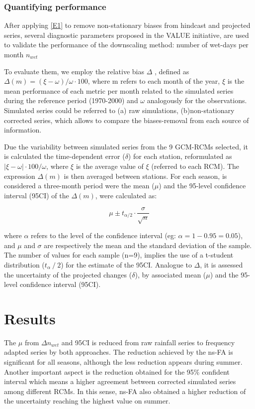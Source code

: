 \documentclass[a4paper,11pt]{article}
\begin{document}
\subsubsection{Quantifying performance} 
After applying \ref{E1} to remove non-stationary biases from hindcast and projected series, several diagnostic parameters proposed in the VALUE initiative, are used to validate the performance of the downscaling method: number of wet-days per month $n_{wet}$

To evaluate them, we employ the relative bias $\Delta$ \cite{bib9}, defined as $\Delta(m) =(\xi-\omega)/\omega \cdot 100$, where m refers to each month of the year, $\xi$ is the mean performance of each metric per month related to the simulated series during the reference period (1970-2000) and $\omega$ analogously for the observations. Simulated series could be referred to (a) raw simulations, (b)non-stationary corrected series, which allows to compare the biases-removal from each source of information. 

Due the variability between simulated series from the 9 GCM-RCMs selected, it is calculated the time-dependent error ($\delta$) for each station, reformulated as $ \lvert{\xi} - {\omega}\rvert \cdot 100/ \omega$, where ${\xi}$ is the average value of $\xi$ (referred to each RCM). The expression $\Delta(m)$ is then averaged between stations. For each season, is considered a three-month period were the mean ($\mu$) and the 95-level confidence interval (95CI) of the  $\Delta(m)$, were calculated as: 

\begin{equation}
\mu \pm t_{\alpha/2} \cdot \dfrac{\sigma}{\sqrt{n}}
\label{E2}
\end{equation}

where $\alpha$  refers to the level of the confidence interval (eg: $\alpha = 1 - 0.95 = 0.05$), and $\mu$ and $\sigma$ are respectively the mean and the standard deviation of the sample. The number of values for each sample (n=9), implies the use of a t-student distribution ($t_\alpha⁄2$) for the estimate of the 95CI. Analogue to $\Delta$, it is assessed the uncertainty of the projected changes ($\delta$), by associated mean ($\mu$) and the 95-level confidence interval (95CI). 


\section{Results}\label{sec4}

The $\mu$ from $\Delta n_{wet}$  and 95CI  is reduced from raw rainfall series to frequency adapted series by both approaches. The reduction achieved by the ns-FA is significant for all seasons, although the less reduction appears during summer. Another important aspect is the reduction obtained for the 95\% confident interval which means a higher agreement between corrected simulated series among different RCMs. In this sense, ns-FA also obtained a higher reduction of the uncertainty reaching the highest value on summer. 
\end{document}

